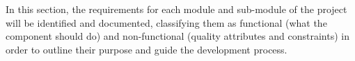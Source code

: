 
In this section, the requirements for each module and sub-module of the project will be identified and documented, classifying them as functional (what the component should do) and non-functional (quality attributes and constraints) in order to outline their purpose and guide the development process.